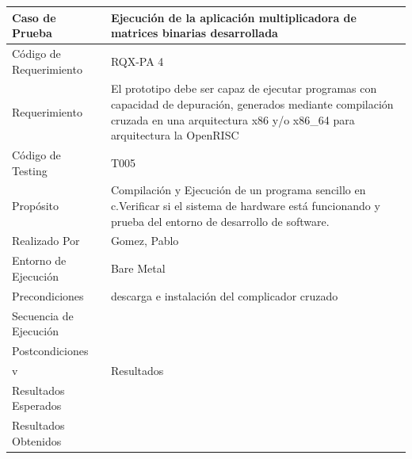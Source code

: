 \newpage
\begin{table}[!h]
		\centering
		\begin{tabular}{ p{5cm} p{10cm}  }
		\hline 
	\rowcolor[gray]{0.8}  Caso de Prueba& Ejecución de la aplicación multiplicadora de matrices binarias  desarrollada \\
		\hline 
		Código de Requerimiento & RQX-PA 4\\ 
		\hline 
		Requerimiento  &  El prototipo debe ser capaz de ejecutar programas con capacidad de depuración, generados mediante compilación cruzada en una arquitectura x86 y/o x86\_64 para arquitectura la OpenRISC\\ 
		\hline 
		Código de Testing & T005\\ 
		\hline
		Propósito &  Compilación y Ejecución de un  programa sencillo en c.Verificar si el sistema de hardware está funcionando y  prueba del entorno de desarrollo de software. \\
		\hline
		Realizado Por & Gomez, Pablo \\
		\hline	
		Entorno de Ejecución & Bare Metal \\
		\hline
		Precondiciones & descarga e instalación del complicador cruzado \\
		\hline
		Secuencia de Ejecución &  \\
		\hline
		Postcondiciones & \\
		\hline
		\rowcolor[gray]{0.8}  v&Resultados\\
		\hline
		Resultados Esperados & \\
		\hline	
		Resultados Obtenidos & \\
		\hline
		\end{tabular}
		\end{table}
\newpage

